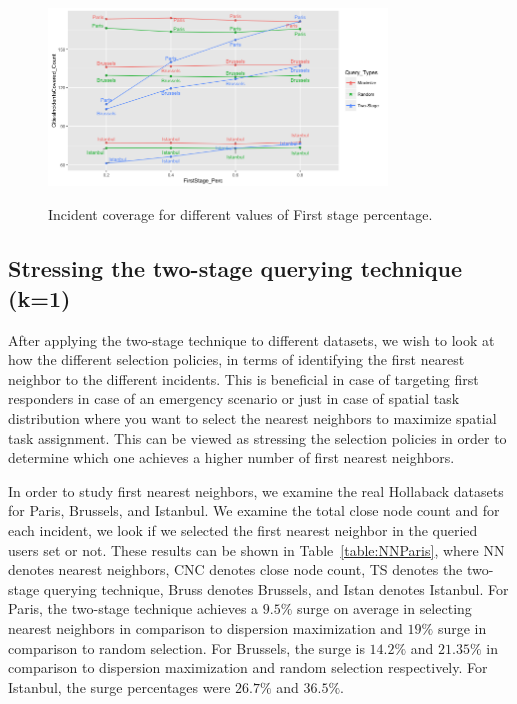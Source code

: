 \documentclass{acm_proc_article-sp}
\begin{document}
\begin{figure}[!h]
\centering
 \includegraphics[width=9cm ,height=5.5cm]{figuresPng/citiesInc.png}
 \caption{Incident coverage for different values of First stage percentage. }
 \label{fig: hollaIncCoverage}
\end{figure}


\subsection{Stressing the two-stage querying technique (k=1)}
After applying the two-stage technique to different datasets, we wish to look at how the different selection policies, in terms of identifying the first nearest neighbor to the different incidents. This is beneficial in case of targeting first responders in case of an emergency scenario or just in case of spatial task distribution where you want to select the nearest neighbors to maximize spatial task assignment. This can be viewed as stressing the selection policies in order to determine which one achieves a higher number of first nearest neighbors.\par
In order to study first nearest neighbors, we examine the real Hollaback datasets for Paris, Brussels, and Istanbul. We examine the total close node count and for each incident, we look if we selected the first nearest neighbor in the queried users set or not. These results can be shown in Table~\ref{table:NNParis}, where NN denotes nearest neighbors, CNC denotes close node count, TS denotes the two-stage querying technique, Bruss denotes Brussels, and Istan denotes Istanbul. For Paris, the two-stage technique achieves a $9.5\%$ surge on average in selecting nearest neighbors in comparison to dispersion maximization and $19\%$ surge in comparison to random selection. For Brussels, the surge is $14.2\%$ and $21.35\%$ in comparison to dispersion maximization and random selection respectively. For Istanbul, the surge percentages were $26.7\%$ and $36.5\%$.
\end{document}
